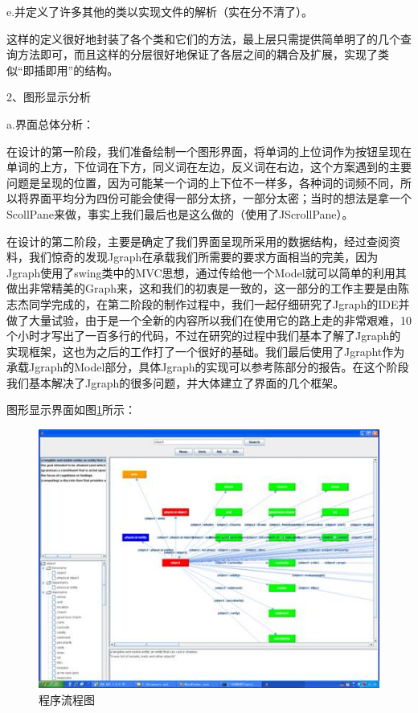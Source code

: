 \documentclass[a4paper,unicode=true,xetex]{article}
\begin{document}
e.并定义了许多其他的类以实现文件的解析（实在分不清了）。

这样的定义很好地封装了各个类和它们的方法，最上层只需提供简单明了的几个查询方法即可，而且这样的分层很好地保证了各层之间的耦合及扩展，实现了类似“即插即用”的结构。

2、图形显示分析

a.界面总体分析：

在设计的第一阶段，我们准备绘制一个图形界面，将单词的上位词作为按钮呈现在单词的上方，下位词在下方，同义词在左边，反义词在右边，这个方案遇到的主要问题是呈现的位置，因为可能某一个词的上下位不一样多，各种词的词频不同，所以将界面平均分为四份可能会使得一部分太挤，一部分太密；当时的想法是拿一个ScollPane来做，事实上我们最后也是这么做的（使用了JScrollPane）。

在设计的第二阶段，主要是确定了我们界面呈现所采用的数据结构，经过查阅资料，我们惊奇的发现Jgraph在承载我们所需要的要求方面相当的完美，因为Jgraph使用了swing类中的MVC思想，通过传给他一个Model就可以简单的利用其做出非常精美的Graph来，这和我们的初衷是一致的，这一部分的工作主要是由陈志杰同学完成的，在第二阶段的制作过程中，我们一起仔细研究了Jgraph的IDE并做了大量试验，由于是一个全新的内容所以我们在使用它的路上走的非常艰难，10个小时才写出了一百多行的代码，不过在研究的过程中我们基本了解了Jgraph的实现框架，这也为之后的工作打了一个很好的基础。我们最后使用了Jgrapht作为承载Jgraph的Model部分，具体Jgraph的实现可以参考陈部分的报告。在这个阶段我们基本解决了Jgraph的很多问题，并大体建立了界面的几个框架。

图形显示界面如图\ref{fig}所示：
\begin{figure}
  \centering
  \includegraphics[scale=1.0]{screenshot.jpg}  
  \caption{程序流程图}
  \label{fig}
\end{figure}
\end{document}
